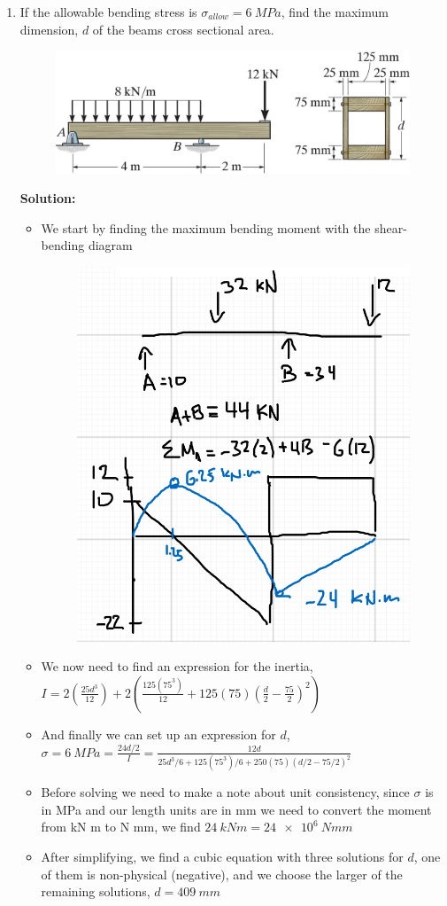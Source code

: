 \documentclass[12pt, oneside]{article}
\begin{document}
\begin{enumerate}
	\item %
		If the allowable bending stress is $\sigma_{allow} = \SI{6}{MPa}$, find the maximum dimension, $d$ of the beams cross sectional area.
		\begin{figure}[H]
			\centering
			\includegraphics[width=0.8\linewidth]{6-101}
		\end{figure}
			\textbf{Solution:}
			\begin{itemize}
				\item We start by finding the maximum bending moment with the shear-bending diagram
					\begin{figure}[H]
						\centering
						\includegraphics[width=0.6\linewidth]{5-6}
					\end{figure}
				\item We now need to find an expression for the inertia, $I = 2 \left( \frac{25d^3}{12} \right) + 2 \left( \frac{125(75^3)}{12} + 125(75)\left(\frac{d}{2} - \frac{75}{2}\right )^2 \right)$
				\item And finally we can set up an expression for $d$, $\sigma = 	\SI{6 }{MPa} = \frac{24 d/2}{I} = \frac{12 d}{25d^3/6 + 125(75^3)/6 + 250(75)(d/2-75/2)^2} $
				\item Before solving we need to make a note about unit consistency, since $\sigma$ is in MPa and our length units are in mm we need to convert the moment from kN m to N mm, we find $ 	\SI{24}{kN m} = 	\SI{24e6}{N mm}   $
				\item After simplifying, we find a cubic equation with three solutions for $d$, one of them is non-physical (negative), and we choose the larger of the remaining solutions, $d = 	\SI{409}{mm} $
			\end{itemize}


\end{enumerate}
\end{document}
